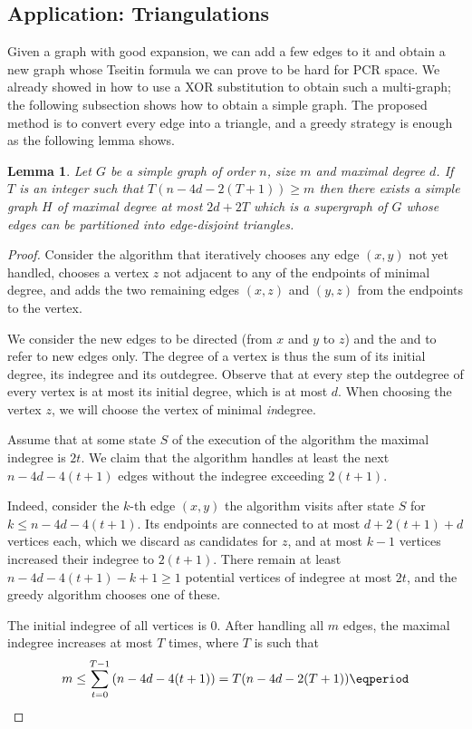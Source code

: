 \documentclass[11pt]{article}
\numberwithin{equation}{section}
\newtheorem{lemma}[theorem]{Lemma}
\theoremstyle{definition}
\theoremstyle{plain}
\begin{document}
\subsection{Application: Triangulations}
\label{sec:triangulations}

Given a graph with good expansion, we can add a few edges to it and obtain a new graph whose Tseitin formula we can prove to be hard for PCR space. We already showed in  how to use a XOR substitution to obtain such a multi-graph; the following subsection shows how to obtain a simple graph. The proposed method is to convert every edge into a triangle, and a greedy strategy is enough as the following lemma shows.

\begin{lemma}
\label{lem:triangulation}
  Let $G$ be a simple graph of order $n$, size $m$ and maximal degree $d$. If $T$ is an integer such that $T(n-4d-2(T+1))\geq m$ then there exists a simple graph $H$ of maximal degree at most $2d+2T$ which is a supergraph of $G$ whose edges can be partitioned into edge-disjoint triangles.
\end{lemma}

\begin{proof}
  Consider the algorithm that iteratively chooses any edge $(x,y)$ not yet handled, chooses a vertex $z$ not adjacent to any of the endpoints of minimal degree, and adds the two remaining edges $(x,z)$ and $(y,z)$ from the endpoints to the vertex.

We consider the new edges to be directed (from $x$ and $y$ to $z$) and the  and  to refer to new edges only. The degree of a vertex is thus the sum of its initial degree, its indegree and its outdegree. Observe that at every step the outdegree of every vertex is at most its initial degree, which is at most $d$. When choosing the vertex $z$, we will choose the vertex of minimal \emph{in}degree.

Assume that at some state $S$ of the execution of the algorithm the maximal indegree is $2t$. We claim that the algorithm handles at least the next $n-4d-4(t+1)$ edges without the indegree exceeding $2(t+1)$.

Indeed, consider the $k$-th edge $(x,y)$ the algorithm visits after state $S$ for $k \leq n-4d-4(t+1)$. Its endpoints are connected to at most $d+2(t+1)+d$ vertices each, which we discard as candidates for $z$, %
and at most $k-1$ vertices increased their indegree to $2(t+1)$.
%
There remain at least $n-4d-4(t+1)-k+1\geq 1$ potential vertices of indegree at most $2t$, and the greedy algorithm chooses one of these.

%
The initial indegree of all vertices is $0$. After handling all $m$ edges, the maximal indegree increases at most $T$ times, where $T$ is such that
\begin{equation}
  \label{eq:triangulation-bound}
  m\leq \sum_{t=0}^{T-1}\left(n-4d-4(t+1)\right) = T(n-4d-2(T+1)) \eqperiod \qedhere
\end{equation}
\end{proof}
\end{document}
